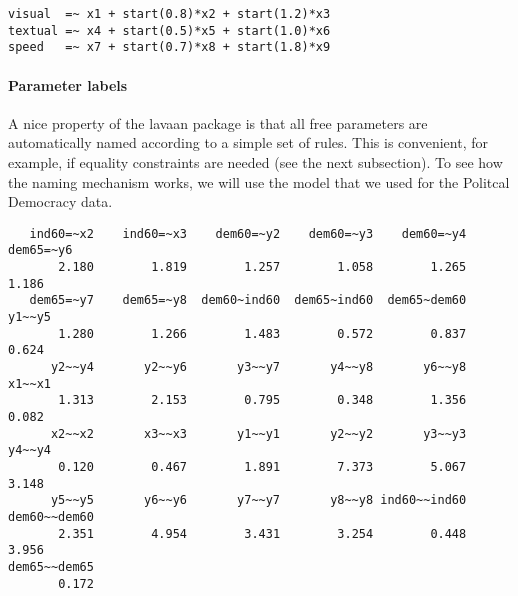 \begin{verbatim}
visual  =~ x1 + start(0.8)*x2 + start(1.2)*x3
textual =~ x4 + start(0.5)*x5 + start(1.0)*x6
speed   =~ x7 + start(0.7)*x8 + start(1.8)*x9
\end{verbatim}

\hypertarget{parameter-labels}{%
\paragraph{Parameter labels}\label{parameter-labels}}

A nice property of the lavaan package is that all free parameters are
automatically named according to a simple set of rules. This is
convenient, for example, if equality constraints are needed (see the
next subsection). To see how the naming mechanism works, we will use the
model that we used for the Politcal Democracy data.

\begin{Shaded}
\begin{Highlighting}[]
\OtherTok{\textless{}{-}} \StringTok{\textquotesingle{}}
\StringTok{\textquotesingle{}}

\OtherTok{\textless{}{-}} 

\end{Highlighting}
\end{Shaded}

\begin{verbatim}
   ind60=~x2    ind60=~x3    dem60=~y2    dem60=~y3    dem60=~y4    dem65=~y6 
       2.180        1.819        1.257        1.058        1.265        1.186 
   dem65=~y7    dem65=~y8  dem60~ind60  dem65~ind60  dem65~dem60       y1~~y5 
       1.280        1.266        1.483        0.572        0.837        0.624 
      y2~~y4       y2~~y6       y3~~y7       y4~~y8       y6~~y8       x1~~x1 
       1.313        2.153        0.795        0.348        1.356        0.082 
      x2~~x2       x3~~x3       y1~~y1       y2~~y2       y3~~y3       y4~~y4 
       0.120        0.467        1.891        7.373        5.067        3.148 
      y5~~y5       y6~~y6       y7~~y7       y8~~y8 ind60~~ind60 dem60~~dem60 
       2.351        4.954        3.431        3.254        0.448        3.956 
dem65~~dem65 
       0.172 
\end{verbatim}

